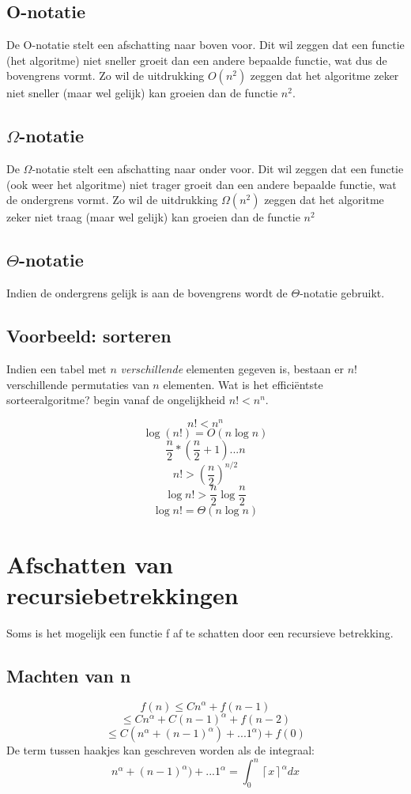 \documentclass[12pt]{report}
\def\lc{\left\lceil}
\def\rc{\right\rceil}
\begin{document}
\subsection{O-notatie}
De O-notatie stelt een afschatting naar boven voor. Dit wil zeggen dat een functie (het algoritme) niet sneller groeit dan een andere bepaalde functie, wat dus de bovengrens vormt. Zo wil de uitdrukking $O(n^2)$ zeggen dat het algoritme zeker niet sneller (maar wel gelijk) kan groeien dan de functie $n^2$. 
\subsection{$\Omega$-notatie}
De $\Omega$-notatie stelt een afschatting naar onder voor. Dit wil zeggen dat een functie (ook weer het algoritme) niet trager groeit dan een andere bepaalde functie, wat de ondergrens vormt. Zo wil de uitdrukking $\Omega(n^2)$ zeggen dat het algoritme zeker niet traag (maar wel gelijk) kan groeien dan de functie $n^2$
\subsection{$\Theta$-notatie}
Indien de ondergrens gelijk is aan de bovengrens wordt de $\Theta$-notatie gebruikt. 
\subsection{Voorbeeld: sorteren}
Indien een tabel met $n$ \textit{verschillende} elementen gegeven is, bestaan er $n!$ verschillende permutaties van $n$ elementen. Wat is het efficiëntste sorteeralgoritme? begin vanaf de ongelijkheid $n! < n^n$.

$$ n! < n^n$$ 
$$\log(n!) = O(n\log n)$$
$$\frac{n}{2}*(\frac{n}{2}+1) ... n$$
$$n! > (\frac{n}{2})^{n/2}$$
$$\log n! > \frac{n}{2}\log\frac{n}{2}$$
$$\log n! = \Theta(n\log n)$$
\section{Afschatten van recursiebetrekkingen}
Soms is het mogelijk een functie f af te schatten door een recursieve betrekking.
\subsection{Machten van n}
$$f(n) \leq Cn^{\alpha} + f(n - 1)$$
$$\leq Cn^\alpha + C(n - 1)^\alpha + f(n - 2)$$
$$\leq C(n^\alpha + (n - 1)^\alpha) + ... 1^\alpha) + f(0)$$
De term tussen haakjes kan geschreven worden als de integraal: 
$$n^\alpha + (n - 1)^\alpha) + ... 1^\alpha = \int_{0}^{n} \lc x\rc^\alpha dx$$
\end{document}
